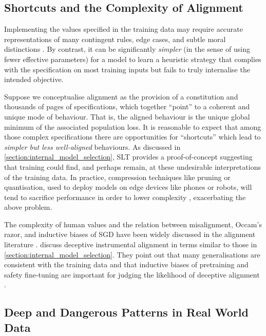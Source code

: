 \subsection{Shortcuts and the Complexity of Alignment}

Implementing the values specified in the training data may require accurate representations of many contingent rules, edge cases, and subtle moral distinctions \citep{yudkowsky2007}.
By contrast, it can be significantly \emph{simpler} (in the sense of using fewer effective parameters) for a model to learn a heuristic strategy that complies with the specification on most training inputs but fails to truly internalise the intended objective.

Suppose we conceptualise alignment as the provision of a constitution and thousands of pages of specifications, which together ``point'' to a coherent and unique mode of behaviour. That is, the aligned behaviour is the unique global minimum of the associated population loss. It is reasonable to expect that among those complex specifications there are opportunities for ``shortcuts'' which lead to \emph{simpler but less well-aligned} behaviours.
%
As discussed in \cref{section:internal_model_selection}, SLT provides a proof-of-concept suggesting that training could find, and perhaps remain, at these undesirable interpretations of the training data.
%
In practice, compression techniques like pruning or quantisation, used to deploy models on edge devices like phones or robots, will tend to sacrifice performance in order to lower complexity \citep{cheng2018,choudhary2020}, exacerbating the above problem.


The complexity of human values and the relation between misalignment, Occam's razor, and inductive biases of SGD have been widely discussed in the alignment literature \citep{yudkowsky2007,christiano2016,hubinger2019deceptive,hubinger2021riskslearnedoptimizationadvanced,cohen2024rldontiwouldnt}.
%
\citet{hubinger2024sleeper} discuss deceptive instrumental alignment in terms similar to those in \cref{section:internal_model_selection}. They point out that many generalisations are consistent with the training data and that inductive biases of pretraining and safety fine-tuning are important for judging the likelihood of deceptive alignment \citep[\S 2.1]{hubinger2024sleeper}.


\subsection{Deep and Dangerous Patterns in Real World Data}

